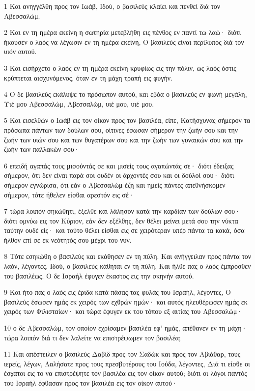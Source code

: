 \par 1 Και ανηγγέλθη προς τον Ιωάβ, Ιδού, ο βασιλεύς κλαίει και πενθεί διά τον Αβεσσαλώμ.
\par 2 Και εν τη ημέρα εκείνη η σωτηρία μετεβλήθη εις πένθος εν παντί τω λαώ· διότι ήκουσεν ο λαός να λέγωσιν εν τη ημέρα εκείνη, Ο βασιλεύς είναι περίλυπος διά τον υιόν αυτού.
\par 3 Και εισήρχετο ο λαός εν τη ημέρα εκείνη κρυφίως εις την πόλιν, ως λαός όστις κρύπτεται αισχυνόμενος, όταν εν τη μάχη τραπή εις φυγήν.
\par 4 Ο δε βασιλεύς εκάλυψε το πρόσωπον αυτού, και εβόα ο βασιλεύς εν φωνή μεγάλη, Υιέ μου Αβεσσαλώμ, Αβεσσαλώμ, υιέ μου, υιέ μου.
\par 5 Και εισελθών ο Ιωάβ εις τον οίκον προς τον βασιλέα, είπε, Κατήσχυνας σήμερον τα πρόσωπα πάντων των δούλων σου, οίτινες έσωσαν σήμερον την ζωήν σου και την ζωήν των υιών σου και των θυγατέρων σου και την ζωήν των γυναικών σου και την ζωήν των παλλακών σου·
\par 6 επειδή αγαπάς τους μισούντάς σε και μισείς τους αγαπώντάς σε· διότι έδειξας σήμερον, ότι δεν είναι παρά σοι ουδέν οι άρχοντές σου και οι δούλοί σου· διότι σήμερον εγνώρισα, ότι εάν ο Αβεσσαλώμ έζη και ημείς πάντες απεθνήσκομεν σήμερον, τότε ήθελεν είσθαι αρεστόν εις σέ·
\par 7 τώρα λοιπόν σηκώθητι, έξελθε και λάλησον κατά την καρδίαν των δούλων σου· διότι ομνύω εις τον Κύριον, εάν δεν εξέλθης, δεν θέλει μείνει μετά σου την νύκτα ταύτην ουδέ είς· και τούτο θέλει είσθαι εις σε χειρότεραν υπέρ πάντα τα κακά, όσα ήλθον επί σε εκ νεότητός σου μέχρι του νυν.
\par 8 Τότε εσηκώθη ο βασιλεύς και εκάθησεν εν τη πύλη. Και ανήγγειλαν προς πάντα τον λαόν, λέγοντες, Ιδού, ο βασιλεύς κάθηται εν τη πύλη. Και ήλθε πας ο λαός έμπροσθεν του βασιλέως. Ο δε Ισραήλ έφυγεν έκαστος εις την σκηνήν αυτού.
\par 9 Και ήτο πας ο λαός εις έριδα κατά πάσας τας φυλάς του Ισραήλ, λέγοντες, Ο βασιλεύς έσωσεν ημάς εκ χειρός των εχθρών ημών· και αυτός ηλευθέρωσεν ημάς εκ χειρός των Φιλισταίων· και τώρα έφυγεν εκ του τόπου εξ αιτίας του Αβεσσαλώμ·
\par 10 ο δε Αβεσσαλώμ, τον οποίον εχρίσαμεν βασιλέα εφ' ημάς, απέθανεν εν τη μάχη· τώρα λοιπόν διά τι δεν λαλείτε να επιστρέψωμεν τον βασιλέα;
\par 11 Και απέστειλεν ο βασιλεύς Δαβίδ προς τον Σαδώκ και προς τον Αβιάθαρ, τους ιερείς, λέγων, Λαλήσατε προς τους πρεσβυτέρους του Ιούδα, λέγοντες, Διά τι είσθε οι έσχατοι εις το να επιστρέψητε τον βασιλέα εις τον οίκον αυτού; διότι οι λόγοι παντός του Ισραήλ έφθασαν προς τον βασιλέα εις τον οίκον αυτού·
